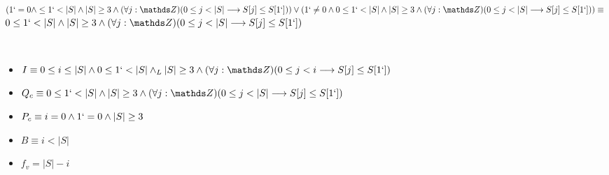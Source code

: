 \documentclass[10pt,a4paper]{article}
\begin{document}
$(1`=0 \land \leq 1` <|S| \land |S|\geq 3 \land (\forall j: \ent)(0\leq j < |S| \longrightarrow S[j]\leq S[1`]) )   \lor  ( 1`\neq 0 \land 0\leq 1` <|S| \land |S|\geq 3 \land (\forall j: \ent)(0\leq j < |S| \longrightarrow S[j]\leq S[1`])) \equiv$ \\

$0\leq 1` <|S| \land |S|\geq 3 \land (\forall j: \ent)(0\leq j < |S| \longrightarrow S[j]\leq S[1`])$

\\


\begin{itemize}
    \item $I \equiv  0\leq i\leq|S| \land 0 \leq 1`<|S|  \land_L |S| \geq 3 \land (\forall j: \ent)(0\leq j < i \longrightarrow S[j]\leq S[1`]) $
    \item $Q_c \equiv 0\leq 1` <|S| \land |S|\geq 3 \land (\forall j: \ent)(0\leq j < |S| \longrightarrow S[j]\leq S[1`])$
    \item $P_c \equiv  i=0 \land 1`=0 \land |S|\geq 3$ 
    \item $B \equiv i<|S|$
    \item $f_v = |S|-i$
\end{itemize}
\end{document}
